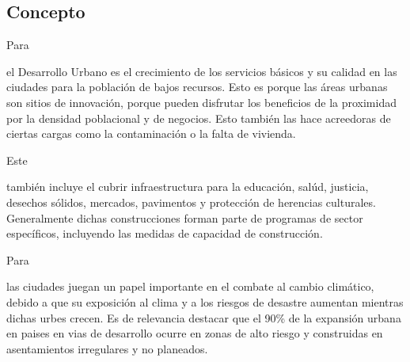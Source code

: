 \documentclass[stu, 12pt, letterpaper, donotrepeattitle, floatsintext, natbib]{apa7}
\begin{document}
\subsection{Concepto}
Para \begin{justifying}
    \cite{corvo-2020}
    el Desarrollo Urbano es el crecimiento de los servicios básicos y su calidad en las ciudades para la población
    de bajos recursos. Esto es porque las áreas urbanas son sitios de innovación, porque pueden disfrutar los beneficios
    de la proximidad por la densidad poblacional y de negocios. Esto también las hace acreedoras de ciertas cargas
    como la contaminación o la falta de vivienda.\par
\end{justifying}
Este \begin{justifying}
    también incluye el cubrir infraestructura para la educación, salúd, justicia, desechos sólidos, mercados, pavimentos y protección de herencias
    culturales. Generalmente dichas construcciones forman parte de programas de sector específicos, incluyendo las medidas de capacidad de construcción.\par
\end{justifying}
Para \begin{justifying}
    \cite{unknown-author-no-dateA} %
    las ciudades juegan un papel importante en el combate al cambio climático, debido a que su exposición al clima y a los riesgos de desastre aumentan mientras
    dichas urbes crecen. Es de relevancia destacar que el 90\% de la expansión urbana en paises en vias de desarrollo ocurre en zonas de alto
    riesgo y construidas en asentamientos irregulares y no planeados.\par
\end{justifying}
\vspace{\baselineskip}
\end{document}
